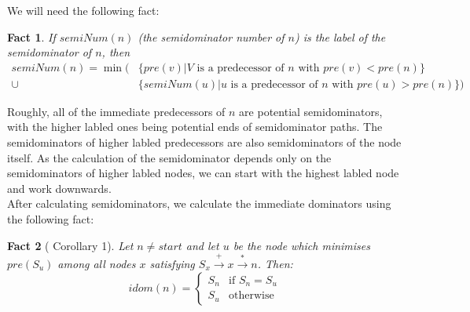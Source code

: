 \documentclass[12pt,a4paper]{article}
\newtheorem{fact}{Fact}
\begin{document}
\begin{enumerate}
We will need the following fact:
\begin{fact}\label{thm:semidominator}
If $semiNum(n)$ (the \emph{semidominator number} of $n$) is the label of the semidominator of $n$, then
\begin{align*}
semiNum(n) = \min(&\{pre(v) | V \text{ is a predecessor of $n$ with } pre(v) < pre(n)\}\\
\cup &\{semiNum(u) | u \text{ is a predecessor of $n$ with } pre(u) > pre(n)\})
\end{align*}
\end{fact}
Roughly, all of the immediate predecessors of $n$ are potential semidominators, with the higher labled ones being potential ends of semidominator paths. The semidominators of higher labled predecessors are also semidominators of the node itself. As the calculation of the semidominator depends only on the semidominators of higher labled nodes, we can start with the highest labled node and work downwards.\\
After calculating semidominators, we calculate the immediate dominators using the following fact:
\begin{fact}[\cite{lengtarj} Corollary 1]\label{thm:imdominators}
Let $n \neq start$ and let $u$ be the node which minimises $pre(S_u)$ among all nodes $x$ satisfying $S_x \xrightarrow{+} x \xrightarrow{*} n$. Then:
\[
  idom(n) =
  \begin{cases}
  S_n & \text{if } S_n = S_u\\
  S_u & \text{otherwise}
  \end{cases}
\]
\end{fact}


\end{enumerate}
\end{document}
